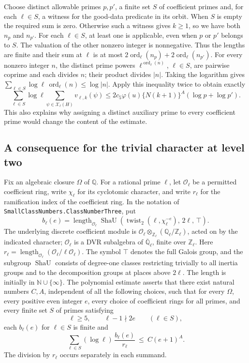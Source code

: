 Choose distinct allowable primes \(p,p'\), a finite set \(S\) of
coefficient primes and, for each \(\ell\in S\), a witness for the
good-data predicate in its orbit. When \(S\) is empty the required sum
is zero. Otherwise such a witness gives \(k\ge1\), so we have both
\(n_p\) and \(n_{p'}\). For each \(\ell\in S\), at least one is
applicable, even when \(p\) or \(p'\) belongs to \(S\). The valuation
of the other nonzero integer is nonnegative. Thus the lengths are
finite and their sum at \(\ell\) is at most
\(2\operatorname{ord}_\ell(n_p)+2\operatorname{ord}_\ell(n_{p'})\).
For every nonzero integer \(n\), the distinct prime powers
\(\ell^{\operatorname{ord}_\ell(n)}\), \(\ell\in S\), are pairwise
coprime and each divides \(n\); their product divides \(|n|\).
Taking the logarithm gives
\(\sum_{\ell\in S}\log\ell\,\operatorname{ord}_\ell(n)\le\log|n|\).
Apply this inequality twice to obtain exactly
\[
   \sum_{\ell\in S}\log\ell
         \sum_{\psi\in\mathcal X_\ell(H)}v_{\ell,k}(\psi)
     \le 2c_5\varphi(u)\{N(k+1)\}^A(\log p+\log p').
\]
This also explains why assigning a distinct auxiliary prime to every
coefficient prime would change the content of the estimate.

\subsection{A consequence for the trivial character at level two}

Fix an algebraic closure \(\Omega\) of \(\mathbb Q\). For a rational prime
\(\ell\), let \(\mathcal O_\ell\) be a permitted coefficient ring, write
\(\chi_\ell\) for its cyclotomic character, and write
\(r_\ell\) for the ramification index of the coefficient ring.
In the notation of \texttt{Small\allowbreak{}Class\allowbreak{}Numbers.\allowbreak{}Class\allowbreak{}Number\allowbreak{}Three}, put
\[
  b_\ell(e)=
  \operatorname{length}_{\mathcal O_\ell}
  \operatorname{ShaU}\!\left(
    \operatorname{twist}_2(\ell,\chi_\ell^{-e}),\,2\ell,\,\top
  \right).
\]
The underlying discrete coefficient module is
\(\mathcal O_\ell\otimes_{\mathbb Z_\ell}(\mathbb Q_\ell/\mathbb Z_\ell)\),
acted on by the indicated character; \(\mathcal O_\ell\) is a DVR
subalgebra of \(\overline{\mathbb Q}_\ell\), finite over
\(\mathbb Z_\ell\). Here \(r_\ell=\operatorname{length}_{\mathcal O_\ell}
(\mathcal O_\ell/\ell\mathcal O_\ell)\).
The symbol \(\top\) denotes the full Galois group, and the subgroup
\(\operatorname{ShaU}\) consists of degree-one classes restricting
trivially to all inertia groups and to the decomposition groups at
places above \(2\ell\). The length is initially in
\(\mathbb N\cup\{\infty\}\). The
polynomial estimate asserts that there exist natural numbers \(C,A\),
independent of all the following choices, such that for every
\(\Omega\), every positive even integer \(e\), every choice of coefficient
rings for all primes, and every finite set \(S\) of primes satisfying
\[
   \ell\geq 5,\qquad \ell-1\nmid 2e
       \qquad(\ell\in S),
\]
each \(b_\ell(e)\) for \(\ell\in S\) is finite and
\[
     \sum_{\ell\in S}(\log\ell)\,\frac{b_\ell(e)}{r_\ell}
       \ \leq\ C(e+1)^A .
\]
The division by \(r_\ell\) occurs separately in each summand.

